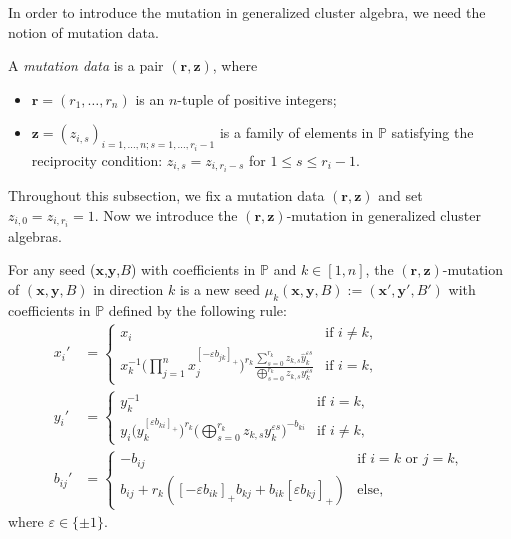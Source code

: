 In order to introduce the mutation in generalized cluster algebra, we need the notion of mutation data.
\begin{Definition}\label{D5}
 A {\it mutation data} is a pair $(\mathbf{r},\mathbf{z})$, where
 \begin{itemize}\itemsep=0pt
 \item $\mathbf{r}=(r_1,\dots,r_n)$ is an $n$-tuple of positive integers;
 \item $\mathbf{z}=(z_{i,s})_{i=1,\dots,n;s=1,\dots,r_{i}-1}$ is a family of elements in $\mathbb{P}$ satisfying the reciprocity condition: $z_{i,s}=z_{i,r_i-s}$ for $1\leq s\leq r_{i}-1$.
 \end{itemize}
\end{Definition}
Throughout this subsection, we fix a mutation data $(\mathbf{r},\mathbf{z})$ and set $z_{i,0}=z_{i,r_i}=1$. Now we introduce the $(\mathbf{r},\mathbf{z})$-mutation in generalized cluster algebras.
\begin{Definition}\label{D6}
 For any seed ($\mathbf{x}$,$\mathbf{y}$,$B$) with coefficients in $\mathbb{P}$ and $k\in[1,n]$, the $(\mathbf{r},\mathbf{z})$-mutation of $(\mathbf{x},\mathbf{y},B)$ in direction $k$ is a new seed $\mu_k(\mathbf{x},\mathbf{y},B):=(\mathbf{x}',\mathbf{y}',B') $ with coefficients in $\mathbb{P}$ defined by the following rule:
\begin{align}
x_i'&=
\begin{cases}
 x_i & \text{if $i\neq k$}, \\
 \displaystyle x_k^{-1}\biggl(\prod\limits_{j=1}^{n}x_j^{[-\varepsilon b_{jk}]_+}\biggr)^{r_k}\frac{\sum\limits_{s=0}^{r_k}z_{k,s}\hat{y}_k^{\varepsilon s}}{\mathop{\bigoplus}\limits_{s=0}^{r_k}z_{k,s}y_k^{\varepsilon s}}& \text{if $i=k$},
\end{cases}\label{E4}
\\
 y_i'&=
\begin{cases}
 y_k^{-1} & \text{if $i= k$}, \\
\displaystyle y_i\bigl(y_k^{[\varepsilon b_{ki}]_+}\bigr)^{r_k}\biggl(\mathop{\bigoplus}\limits_{s=0}^{r_k}z_{k,s}y_k^{\varepsilon s}\biggr)^{-b_{ki}}& \text{if $i\neq k$},
\end{cases}\label{E5}
 \\
 b_{ij}'&=
 \begin{cases}
-b_{ij} &\text{if $i=k$ or $j=k$},\\
b_{ij}+r_k([-\varepsilon b_{ik}]_+b_{kj}+b_{ik}[\varepsilon b_{kj}]_+) &\text{else},
\end{cases}\label{E6}
\end{align}
where $\varepsilon\in\{\pm 1\}$.
\end{Definition}


